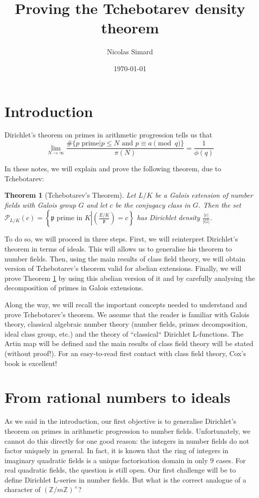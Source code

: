 \documentclass[]{amsart}
\title{Proving the Tchebotarev density theorem}
\date{\today}
\author{Nicolas Simard}
\newtheorem{theorem}{Theorem}
\newcommand{\Z}{\mathbb{Z}}
\newcommand{\p}{\mathfrak{p}}
\newcommand{\PP}{\mathcal{P}}
\newcommand{\Frob}[2]{\left(\frac{#1}{#2}\right )}
\begin{document}
\maketitle
\tableofcontents
\section*{Introduction}
Dirichlet's theorem on primes in arithmetic progression tells us that
\[\lim_{N\rightarrow\infty}\frac{\#\{p\text{ prime}|p\leq N\text{ and }p\equiv a\pmod q\}}{\pi(N)}=\frac{1}{\phi(q)}\]

In these notes, we will explain and prove the following theorem, due to Tchebotarev:

\begin{theorem}[Tchebotarev's Theorem]\label{th:Tche}
	Let $L/K$ be a Galois extension of number fields with Galois group $G$ and let $c$ be the conjugacy class in $G$. Then the set $\PP_{L/K}(c)=\left \{\p\text{ prime in }K\left |\Frob{E/K}{\p}=c\right .\right \}$ has Dirichlet density $\frac{|c|}{|G|}$.
\end{theorem}

To do so, we will proceed in three steps. First, we will reinterpret Dirichlet's theorem in terms of ideals. This will allows us to generalise his theorem to number fields. Then, using the main results of class field theory, we will obtain version of Tchebotarev's theorem valid for abelian extensions. Finally, we will prove Theorem \ref{th:Tche} by using this abelian version of it and by carefully analysing the decomposition of primes in Galois extensions.

Along the way, we will recall the important concepts needed to understand and prove Tchebotarev's theorem. We assume that the reader is familiar with Galois theory, classical algebraic number theory (number fields, primes decomposition, ideal class group, etc.) and the theory of ``classical`` Dirichlet L-functions. The Artin map will be defined and the main results of class field theory will be stated (without proof!). For an easy-to-read first contact with class field theory, Cox's book \cite{Cox} is excellent!

\section{From rational numbers to ideals}
As we said in the introduction, our first objective is to generalise Dirichlet's theorem on primes in arithmetic progression to number fields. Unfortunately, we cannot do this directly for one good reason: the integers in number fields do not factor uniquely in general. In fact, it is known that the ring of integers in imaginary quadratic fields is a unique factorisation domain in only 9 cases. For real quadratic fields, the question is still open. Our first challenge will be to define Dirichlet L-series in number fields. But what is the correct analogue of a character of $(\Z/m\Z)^\times$?
\end{document}
